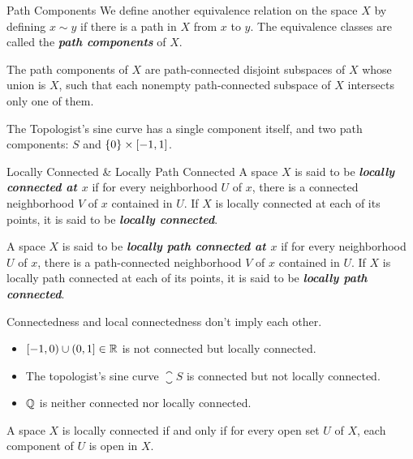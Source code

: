 \documentclass[12pt,a4paper]{article}
\begin{document}
    \begin{defi}{Path Components}
        We define another equivalence relation on the space $X$ by defining $x\sim y$ if there is a path in $X$ from $x$ to $y$. The equivalence classes are called the \textbf{\textit{path components}} of $X$.
    \end{defi}
    \hfill

    \begin{thm}
        The path components of $X$ are path-connected disjoint subspaces of $X$ whose union is $X$, such that each nonempty path-connected subspace of $X$ intersects only one of them.
    \end{thm}
    \hfill

    \begin{eg}
        The Topologist's sine curve has a single component itself, and two path components: $S$ and $\left\{0\right\}\times[-1,1]$.
    \end{eg}
    \hfill

    \begin{defi}{Locally Connected \& Locally Path Connected}
        A space $X$ is said to be \textbf{\textit{locally connected at $x$}} if for every neighborhood $U$ of $x$, there is a connected neighborhood $V$ of $x$ contained in $U$. If $X$ is locally connected at each of its points, it is said to be \textbf{\textit{locally connected}}.

        A space $X$ is said to be \textbf{\textit{locally path connected at $x$}} if for every neighborhood $U$ of $x$, there is a path-connected neighborhood $V$ of $x$ contained in $U$. If $X$ is locally path connected at each of its points, it is said to be \textbf{\textit{locally path connected}}.
    \end{defi}
    \hfill

    \begin{eg}
        Connectedness and local connectedness don't imply each other.
        \begin{itemize}
            \item $[-1,0)\cup(0,1]\in\mathbb{R}$ is not connected but locally connected.
            \item The topologist's sine curve $\closure{S}$ is connected but not locally connected.
            \item $\mathbb{Q}$ is neither connected nor locally connected. 
        \end{itemize}
    \end{eg}
    \hfill

    \begin{thm}
        A space $X$ is locally connected if and only if for every open set $U$ of $X$, each component of $U$ is open in $X$.
    \end{thm}
    \hfill
\end{document}

